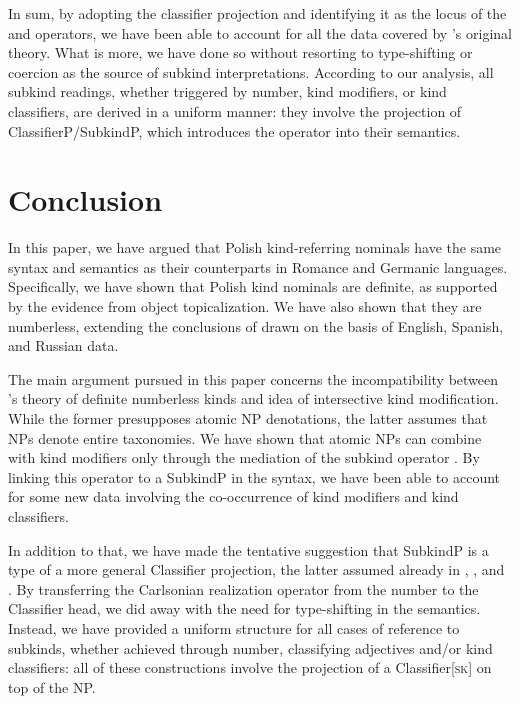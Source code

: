 \documentclass[output=paper,
colorlinks,
citecolor=brown,
newtxmath
]{langscibook}
\begin{document}
In sum, by adopting the classifier projection and identifying it as the locus of the  and  operators, we have been able to account for all the data covered by \citeauthor{Borik.Espinal2012}'s original theory. What is more, we have done so without resorting to type-shifting or coercion as the source of subkind interpretations. According to our analysis, all subkind readings, whether triggered by number, kind modifiers, or kind classifiers, are derived in a uniform manner: they involve the projection of ClassifierP/SubkindP, which introduces the  operator into their semantics.


\section{Conclusion}\label{sec:5-conclusions}

In this paper, we have argued that Polish kind-referring nominals have the same syntax and semantics as their counterparts in Romance and Germanic languages. Specifically, we have shown that Polish kind nominals are definite, as supported by the evidence from object topicalization. We have also shown that they are numberless, extending the conclusions of \citet{Borik.Espinal2012, Borik.Espinal2015} drawn on the basis of English, Spanish, and Russian data.

The main argument pursued in this paper concerns the incompatibility between \citeauthor{Borik.Espinal2012}'s theory of definite numberless kinds and  idea of intersective kind modification. While the former presupposes atomic NP denotations, the latter assumes that NPs denote entire taxonomies. We have shown that atomic NPs can combine with kind modifiers only through the mediation of the subkind operator . By linking this operator to a SubkindP in the syntax, we have been able to account for some new data involving the co-occurrence of kind modifiers and kind classifiers.

In addition to that, we have made the tentative suggestion that SubkindP is a type of a more general Classifier projection, the latter assumed already in \citet{Borer2005}, \citet{Picallo2006}, and \citet{Kratzer2007}. By transferring the Carlsonian realization operator  from the number to the Classifier head, we did away with the need for type-shifting in the semantics. Instead, we have provided a uniform structure for all cases of reference to subkinds, whether achieved through number, classifying adjectives and/or kind classifiers: all of these constructions involve the projection of a Classifier[\textsc{sk}] on top of the NP.
\end{document}
